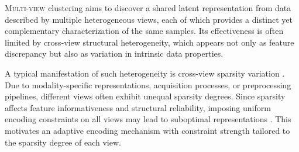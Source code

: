 \documentclass[10pt, journal, compsoc]{IEEEtran}
\begin{document}
\IEEEdisplaynontitleabstractindextext

%
\IEEEpeerreviewmaketitle

\ifCLASSOPTIONcompsoc {}
\lettrine{M}{ulti-view} clustering \cite{wang2013multi,peng2017deep,MVCANxu2024investigating} aims to discover a shared latent representation from data described by multiple heterogeneous views, each of which provides a distinct yet complementary characterization of the same samples. Its effectiveness is often limited by cross-view structural heterogeneity, which appears not only as feature discrepancy but also as variation in intrinsic data properties\cite{liu2022localized,CVCLchen2023deep}.

A typical manifestation of such heterogeneity is cross-view sparsity variation \cite{yin2015multi,liu2025sparsemvc}. Due to modality-specific representations, acquisition processes, or preprocessing pipelines, different views often exhibit unequal sparsity degrees. Since sparsity affects feature informativeness and structural reliability, imposing uniform encoding constraints on all views may lead to suboptimal representations \citep{zhang2023enhanced,kang2024sparse}. This motivates an adaptive encoding mechanism with constraint strength tailored to the sparsity degree of each view.
\end{document}
